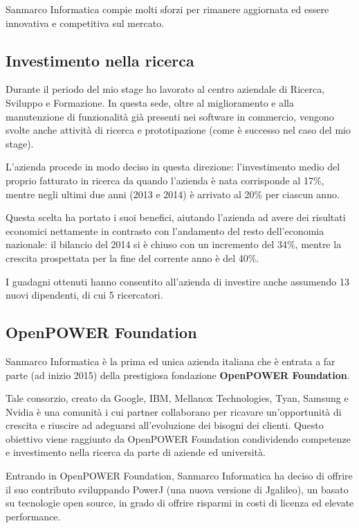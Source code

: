 Sanmarco Informatica compie molti sforzi per rimanere aggiornata ed essere
innovativa e competitiva sul mercato.

\subsection{Investimento nella ricerca} \mbox{}

Durante il periodo del mio stage ho lavorato al centro aziendale di Ricerca,
Sviluppo e Formazione. In questa sede, oltre al miglioramento e alla
manutenzione di funzionalità già presenti nei software in commercio, vengono
svolte anche attività di ricerca e prototipazione (come è successo nel caso
del mio stage).

L'azienda procede in modo deciso in questa direzione: l'investimento medio del
proprio fatturato in ricerca da quando l'azienda è nata corrisponde al 17\%,
mentre negli ultimi due anni (2013 e 2014) è arrivato al 20\% per ciascun anno.

Questa scelta ha portato i suoi benefici, aiutando l'azienda ad avere dei
risultati economici nettamente in contrasto con l'andamento del resto
dell'economia nazionale: il bilancio del 2014 si è chiuso con un incremento del
34\%, mentre la crescita prospettata per la fine del corrente anno è del 40\%.

I guadagni ottenuti hanno consentito all'azienda di investire anche assumendo
13 nuovi dipendenti, di cui 5 ricercatori.

\subsection{OpenPOWER Foundation} \mbox{}

Sanmarco Informatica è la prima ed unica azienda italiana che è entrata a far
parte (ad inizio 2015) della prestigiosa fondazione \textbf{OpenPOWER
Foundation}.

Tale consorzio, creato da Google, IBM, Mellanox Technologies, Tyan, Samsung e
Nvidia è una comunità i cui partner collaborano per ricavare un'opportunità di
crescita e riuscire ad adeguarsi all'evoluzione dei bisogni dei clienti.
Questo obiettivo viene raggiunto da OpenPOWER Foundation condividendo
competenze e investimento nella ricerca da parte di aziende ed università.

Entrando in OpenPOWER Foundation, Sanmarco Informatica ha deciso di offrire il
suo contributo sviluppando PowerJ (una nuova versione di Jgalileo), un
 basato su tecnologie open source, in grado di offrire risparmi in
costi di licenza ed elevate performance.

